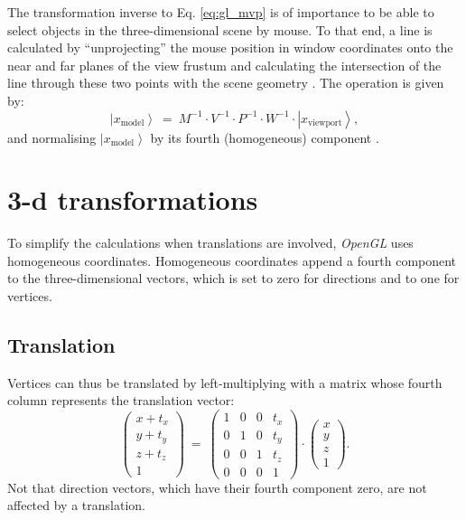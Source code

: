 The transformation inverse to Eq. \ref{eq:gl_mvp} is of importance to be able to select objects in the three-dimensional
scene by mouse. To that end, a line is calculated by ``unprojecting'' the mouse position in window coordinates
onto the near and far planes of the view frustum and calculating the intersection of the line through these
two points with the scene geometry \cite{web_gl_unproject}. The operation is given by:
\begin{equation}
	\left|x_{\mathrm{model}}\right> \ =\ M^{-1} \cdot V^{-1} \cdot P^{-1} \cdot  W^{-1} \cdot  \left| x_{\mathrm{viewport}} \right>,
\end{equation}
and normalising $\left|x_{\mathrm{model}}\right>$ by its fourth (homogeneous) component \cite{web_gl_unproject}.



\section{3-d transformations}
To simplify the calculations when translations are involved, \textit{OpenGL} uses homogeneous coordinates.
Homogeneous coordinates append a fourth component to the three-dimensional vectors, which is set to zero for
directions and to one for vertices.


\subsection{Translation}
Vertices can thus be translated by left-multiplying with a matrix whose fourth column represents the translation
vector:
\begin{equation}
	\left( \begin{array}{c} x + t_x \\ y + t_y \\ z + t_z \\ 1 \end{array} \right) 
	\ =\  
	\left( \begin{array}{cccc} 
		1 & 0 & 0 & t_x \\
		0 & 1 & 0 & t_y \\
		0 & 0 & 1 & t_z \\
		0 & 0 & 0 & 1
	\end{array} \right) \cdot
	\left( \begin{array}{c} x \\ y \\ z \\ 1 \end{array} \right).
\end{equation}
Not that direction vectors, which have their fourth component zero, are not affected by a translation.


